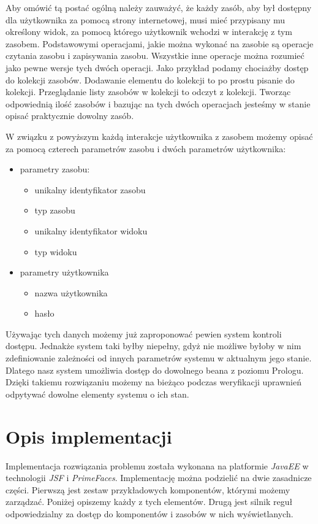 \documentclass{classrep}
\begin{document}
Aby omówić tą postać ogólną należy zauważyć, że każdy zasób, aby był dostępny dla użytkownika za pomocą strony internetowej, musi mieć przypisany mu określony widok, za pomocą którego użytkownik
wchodzi w interakcję z tym zasobem. Podstawowymi operacjami, jakie można wykonać na zasobie są operacje czytania zasobu i zapisywania zasobu. Wszystkie inne operacje można
rozumieć jako pewne wersje tych dwóch operacji. Jako przykład podamy chociażby dostęp do kolekcji zasobów. Dodawanie elementu do kolekcji to po prostu pisanie do kolekcji.
Przeglądanie listy zasobów w kolekcji to odczyt z kolekcji. Tworząc odpowiednią ilość zasobów i bazując na tych dwóch operacjach jesteśmy w stanie opisać praktycznie dowolny zasób.

W związku z powyższym każdą interakcje użytkownika z zasobem możemy opisać za pomocą czterech parametrów zasobu i dwóch parametrów użytkownika:
\begin{itemize}
  \item parametry zasobu:
  \begin{itemize}
    \item unikalny identyfikator zasobu
    \item typ zasobu
    \item unikalny identyfikator widoku
    \item typ widoku
  \end{itemize}
  \item parametry użytkownika
  \begin{itemize}
    \item nazwa użytkownika
    \item hasło
  \end{itemize}
\end{itemize}

Używając tych danych możemy już zaproponować pewien system kontroli dostępu. Jednakże system taki byłby niepełny, gdyż nie możliwe byłoby w nim zdefiniowanie zależności od innych
parametrów systemu w aktualnym jego stanie. Dlatego nasz system umożliwia dostęp do dowolnego beana z poziomu Prologu. Dzięki takiemu rozwiązaniu możemy na bieżąco podczas weryfikacji
uprawnień odpytywać dowolne elementy systemu o ich stan.

\section{Opis implementacji}

Implementacja rozwiązania problemu została wykonana na platformie \textsl{JavaEE} w technologii \textsl{JSF} i \textsl{PrimeFaces}.
Implementację można podzielić na dwie zasadnicze części. 
Pierwszą jest zestaw przykładowych komponentów, którymi możemy zarządzać. Poniżej opiszemy każdy z tych elementów.
Drugą jest silnik reguł odpowiedzialny za dostęp do komponentów i zasobów w nich wyświetlanych. 
\end{document}
